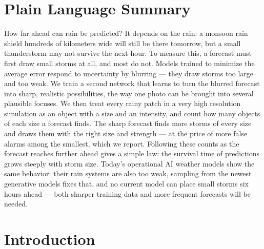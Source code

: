 \documentclass[draft]{agujournal2019}
\begin{document}
\section*{Plain Language Summary}
How far ahead can rain be predicted? It depends on the rain: a monsoon rain
shield hundreds of kilometers wide will still be there tomorrow, but a small
thunderstorm may not survive the next hour. To measure this, a forecast must
first draw small storms at all, and most do not. Models trained to minimize
the average error respond to uncertainty by blurring --- they draw storms too
large and too weak. We train a second network that learns to turn the blurred
forecast into sharp, realistic possibilities, the way one photo can be
brought into several plausible focuses. We then treat every rainy patch in a
very high resolution simulation as an object with a size and an intensity,
and count how many objects of each size a forecast finds. The sharp forecast
finds more storms of every size and draws them with the right size and
strength --- at the price of more false alarms among the smallest, which we
report. Following these counts as the forecast reaches further ahead gives a
simple law: the survival time of predictions grows steeply with storm size.
Today's operational AI weather models show the same behavior: their rain
systems are also too weak, sampling from the newest generative models fixes
that, and no current model can place small storms six hours ahead --- both
sharper training data and more frequent forecasts will be needed.

\section{Introduction}
\end{document}
